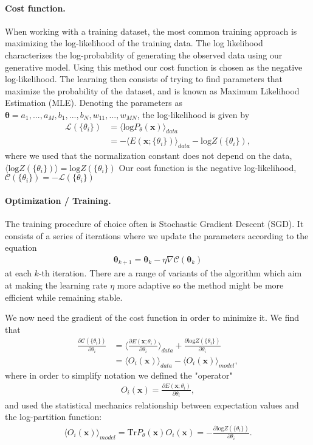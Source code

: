 \documentclass[%
oneside,                 %
final,                   %
10pt]{article}
\begin{document}
\noindent
\paragraph{Cost function.}
When working with a training dataset, the most common training approach is maximizing the log-likelihood of the training data. The log likelihood characterizes the log-probability of generating the observed data using our generative model. Using this method our cost function is chosen as the negative log-likelihood. The learning then consists of trying to find parameters that maximize the probability of the dataset, and is known as Maximum Likelihood Estimation (MLE).
Denoting the parameters as $\bm{\theta} = a_1,...,a_M,b_1,...,b_N,w_{11},...,w_{MN}$, the log-likelihood is given by
\begin{align}
	\mathcal{L}(\{ \theta_i \}) &= \langle \text{log} P_\theta(\bm{x}) \rangle_{data} \\
	&= - \langle E(\bm{x}; \{ \theta_i\}) \rangle_{data} - \text{log} Z(\{ \theta_i\}),
\end{align}
where we used that the normalization constant does not depend on the data, $\langle \text{log} Z(\{ \theta_i\}) \rangle = \text{log} Z(\{ \theta_i\})$
Our cost function is the negative log-likelihood, $\mathcal{C}(\{ \theta_i \}) = - \mathcal{L}(\{ \theta_i \})$

\paragraph{Optimization / Training.}
The training procedure of choice often is Stochastic Gradient Descent (SGD). It consists of a series of iterations where we update the parameters according to the equation
\begin{align}
	\bm{\theta}_{k+1} = \bm{\theta}_k - \eta \nabla \mathcal{C} (\bm{\theta}_k)
\end{align}
at each $k$-th iteration. There are a range of variants of the algorithm which aim at making the learning rate $\eta$ more adaptive so the method might be more efficient while remaining stable.

We now need the gradient of the cost function in order to minimize it. We find that
\begin{align}
	\frac{\partial \mathcal{C}(\{ \theta_i\})}{\partial \theta_i}
	&= \langle \frac{\partial E(\bm{x}; \theta_i)}{\partial \theta_i} \rangle_{data}
	+ \frac{\partial \text{log} Z(\{ \theta_i\})}{\partial \theta_i} \\
	&= \langle O_i(\bm{x}) \rangle_{data} - \langle O_i(\bm{x}) \rangle_{model},
\end{align}
where in order to simplify notation we defined the "operator"
\begin{align}
	O_i(\bm{x}) = \frac{\partial E(\bm{x}; \theta_i)}{\partial \theta_i}, 
\end{align}
and used the statistical mechanics relationship between expectation values and the log-partition function:
\begin{align}
	\langle O_i(\bm{x}) \rangle_{model} = \text{Tr} P_\theta(\bm{x})O_i(\bm{x}) = - \frac{\partial \text{log} Z(\{ \theta_i\})}{\partial \theta_i}.
\end{align}
\end{document}
